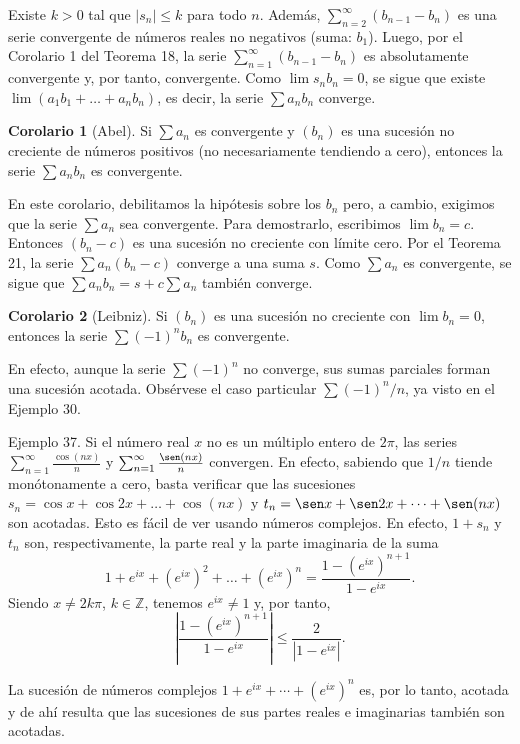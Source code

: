 \documentclass[12pt,oneside]{book}
\begin{document}
Existe \(k > 0\) tal que \(|s_n| \le k\) para todo \(n\). Además, \(\sum_{n=2}^\infty (b_{n-1} - b_n)\) es una serie convergente de números reales no negativos (suma: \(b_1\)). Luego, por el Corolario 1 del Teorema 18, la serie \(\sum_{n=1}^\infty (b_{n-1} - b_n)\) es absolutamente convergente y, por tanto, convergente. Como \(\lim s_n b_n = 0\), se sigue que existe \(\lim (a_1 b_1 + \dots + a_n b_n)\), es decir, la serie \(\sum a_n b_n\) converge.

\textbf{Corolario 1} (Abel). Si \(\sum a_n\) es convergente y \((b_n)\) es una sucesión no creciente de números positivos (no necesariamente tendiendo a cero), entonces la serie \(\sum a_n b_n\) es convergente.

En este corolario, debilitamos la hipótesis sobre los \(b_n\) pero, a cambio, exigimos que la serie \(\sum a_n\) sea convergente. Para demostrarlo, escribimos \(\lim b_n = c\). Entonces \((b_n - c)\) es una sucesión no creciente con límite cero. Por el Teorema 21, la serie \(\sum a_n (b_n - c)\) converge a una suma \(s\). Como \(\sum a_n\) es convergente, se sigue que \(\sum a_n b_n = s + c \sum a_n\) también converge.

\textbf{Corolario 2} (Leibniz). Si \((b_n)\) es una sucesión no creciente con \(\lim b_n = 0\), entonces la serie \(\sum (-1)^n b_n\) es convergente.

En efecto, aunque la serie \(\sum (-1)^n\) no converge, sus sumas parciales forman una sucesión acotada. Obsérvese el caso particular \(\sum (-1)^n / n\), ya visto en el Ejemplo 30.

Ejemplo 37. Si el número real \(x\) no es un múltiplo entero de \(2\pi\), las series \(\sum_{n=1}^\infty \frac{\cos(nx)}{n}\) y \(\sum_{n=1}^\infty \frac{\sen(nx)}{n}\) convergen. En efecto, sabiendo que \(1/n\) tiende monótonamente a cero, basta verificar que las sucesiones \(s_n = \cos x + \cos 2x + \dots + \cos(nx)\) y \(t_n = \sen x + \sen 2x + \dots + \sen(nx)\) son acotadas. Esto es fácil de ver usando números complejos. En efecto, \(1 + s_n\) y \(t_n\) son, respectivamente, la parte real y la parte imaginaria de la suma
\[
1 + e^{ix} + (e^{ix})^2 + \dots + (e^{ix})^n = \frac{1 - (e^{ix})^{n+1}}{1 - e^{ix}}.
\]
Siendo \(x \neq 2k\pi\), \(k \in \mathbb{Z}\), tenemos \(e^{ix} \neq 1\) y, por tanto,
\[
\left| \frac{1 - (e^{ix})^{n+1}}{1 - e^{ix}} \right| \leq \frac{2}{|1 - e^{ix}|}.
\]

La sucesión de números complejos \(1 + e^{ix} + \cdots + (e^{ix})^n\) es, por lo tanto, acotada y de ahí resulta que las sucesiones de sus partes reales e imaginarias también son acotadas.
\end{document}

